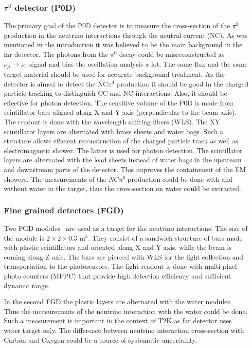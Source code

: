 \documentclass[../main.tex]{subfiles}
\begin{document}
\subsubsection{$\pi^0$ detector (P0D)}
\label{sec:t2k:pod}
The primary goal of the P0D detector is to measure the cross-section of the $\pi^0$ production in the neutrino interactions through the neutral current (NC). As was mentioned in the introduction it was believed to be the main background in the far detector. The photons from the $\pi^0$ decay could be misreconstructed as $\nu_\mu\to\nu_e$ signal and bias the oscillation analysis a lot. The same flux and the same target material should be used for accurate background treatment. As the detector is aimed to detect the NC$\pi^0$ production it should be good in the charged particle tracking to distinguish CC and NC interactions. Also, it should be effective for photon detection. The sensitive volume of the P0D is made from scintillator bars aligned along X and Y axis (perpendicular to the beam axis). The readout is done with the wavelength shifting fibers (WLS). The XY scintillator layers are alternated with brass sheets and water bags. Such a structure allows efficient reconstruction of the charged particle track as well as electromagnetic shower. The latter is used for photon detection. The scintillator layers are alternated with the lead sheets instead of water bags in the upstream and downstream parts of the detector. This improves the containment of the EM showers. The measurements of the $NC\pi^0$ production could be done with and without water in the target, thus the cross-section on water could be extracted.

\subsubsection{Fine grained detectors (FGD)}
Two FGD modules~\cite{Amaudruz2012} are used as a target for the neutrino interactions. The size of the module is $2\times2\times0.3$ $\text{m}^3$. They consist of a sandwich structure of bars made with plastic scintillators and oriented along X and Y axis, while the beam is coming along Z axis. The bars are pierced with WLS for the light collection and transportation to the photosensors. The light readout is done with multi-pixel photo counters (MPPC) that provide high detection efficiency and sufficient dynamic range.

In the second FGD the plastic layers are alternated with the water modules. Thus the measurements of the neutrino interaction with the water could be done. Such a measurement is important in the context of T2K as far detector uses water target only. The difference between neutrino interaction cross-section with Carbon and Oxygen could be a source of systematic uncertainty.
\end{document}
